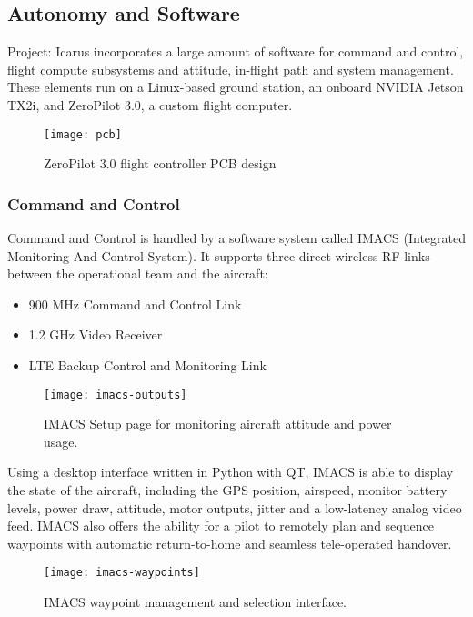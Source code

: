 \subsection{Autonomy and Software}
\label{sec:autonomy-and-software}

Project: Icarus incorporates a large amount of software for command and control, flight
compute subsystems and attitude, in-flight path and system management. These elements
run on a Linux-based ground station, an onboard NVIDIA Jetson TX2i, and ZeroPilot 3.0, a
custom flight computer.

\begin{figure}[H]
        \centering
        \texttt{[image: pcb]}
        \caption{ZeroPilot 3.0 flight controller PCB design}
\end{figure}

\subsubsection{Command and Control}
\label{sec:command-and-control}

Command and Control is handled by a software system called IMACS (Integrated Monitoring
And Control System). It supports three direct wireless RF links between the operational
team and the aircraft:
\begin{itemize}
    \item 900 MHz Command and Control Link
    \item 1.2 GHz Video Receiver
    \item LTE Backup Control and Monitoring Link
\end{itemize}

\begin{figure}[h]
        \centering
        \texttt{[image: imacs-outputs]}
        \caption{IMACS Setup page for monitoring aircraft attitude and power usage.}
\end{figure}

Using a desktop interface written in Python with QT, IMACS is able to display the
state of the aircraft, including the GPS position, airspeed, monitor battery levels, 
power draw, attitude, motor outputs, jitter and a low-latency analog video feed. IMACS
also offers the ability for a pilot to remotely plan and sequence waypoints with
automatic return-to-home and seamless tele-operated handover.

\begin{figure}[H]
        \centering
        \texttt{[image: imacs-waypoints]}
        \caption{IMACS waypoint management and selection interface.}
\end{figure}

